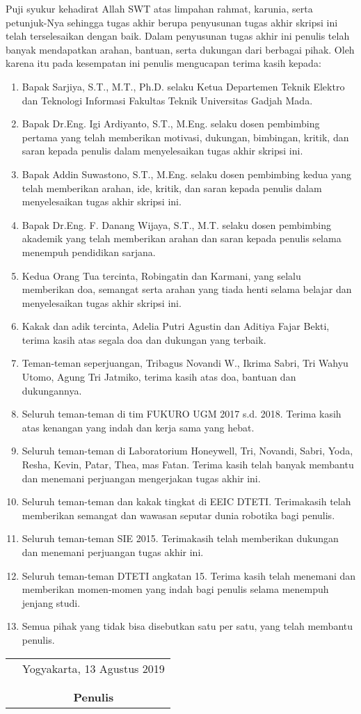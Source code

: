 \documentclass[../thesis.tex]{subfiles}
\begin{document}
\vspace{0.5cm}

Puji syukur kehadirat Allah SWT atas limpahan rahmat, karunia, serta petunjuk-Nya
sehingga tugas akhir berupa penyusunan tugas akhir skripsi ini telah terselesaikan dengan baik.
Dalam penyusunan tugas akhir ini penulis telah banyak mendapatkan arahan, bantuan, serta
dukungan dari berbagai pihak. Oleh karena itu pada kesempatan ini penulis mengucapan terima
kasih kepada:

\begin{enumerate}
\item{Bapak Sarjiya, S.T., M.T., Ph.D. selaku Ketua Departemen Teknik Elektro dan Teknologi Informasi Fakultas Teknik Universitas Gadjah Mada.}
\item{Bapak Dr.Eng. Igi Ardiyanto, S.T., M.Eng. selaku dosen pembimbing pertama yang telah memberikan motivasi, dukungan, bimbingan, kritik, dan saran kepada penulis dalam menyelesaikan tugas akhir skripsi ini.}
\item{Bapak Addin Suwastono, S.T., M.Eng. selaku dosen pembimbing kedua yang telah memberikan arahan, ide, kritik, dan saran kepada penulis dalam menyelesaikan tugas akhir skripsi ini.}
\item{Bapak Dr.Eng. F. Danang Wijaya, S.T., M.T. selaku dosen pembimbing akademik yang telah memberikan arahan dan saran kepada penulis selama menempuh pendidikan sarjana.}
\item{Kedua Orang Tua tercinta, Robingatin dan Karmani, yang selalu memberikan doa, semangat serta arahan yang tiada henti selama belajar dan menyelesaikan tugas akhir skripsi ini.}
\item{Kakak dan adik tercinta, Adelia Putri Agustin dan Aditiya Fajar Bekti, terima kasih atas segala doa dan dukungan yang terbaik.}
\item{Teman-teman seperjuangan, Tribagus Novandi W., Ikrima Sabri, Tri Wahyu Utomo, Agung Tri Jatmiko, terima kasih atas doa, bantuan dan dukungannya.}
\item{Seluruh teman-teman di tim FUKURO UGM 2017 s.d. 2018. Terima kasih atas kenangan yang indah dan kerja sama yang hebat.}
\item{Seluruh teman-teman di Laboratorium Honeywell, Tri, Novandi, Sabri, Yoda, Resha, Kevin, Patar, Thea, mas Fatan. Terima kasih telah banyak membantu dan menemani perjuangan mengerjakan tugas akhir ini.}
\item{Seluruh teman-teman dan kakak tingkat di EEIC DTETI. Terimakasih telah memberikan semangat dan wawasan seputar dunia robotika bagi penulis.} 
\item{Seluruh teman-teman SIE 2015. Terimakasih telah memberikan dukungan dan menemani perjuangan tugas akhir ini.} 
\item{Seluruh teman-teman DTETI angkatan 15. Terima kasih telah menemani dan memberikan momen-momen yang indah bagi penulis selama menempuh jenjang studi.}
\item{Semua pihak yang tidak bisa disebutkan satu per satu, yang telah membantu penulis.}
\end{enumerate}

\vspace{0.5cm}

\begin{tabular}{p{7.5cm}c}
&Yogyakarta, 13 Agustus 2019\\
&\\
&\\
&\textbf{Penulis}
\end{tabular}
\end{document}
